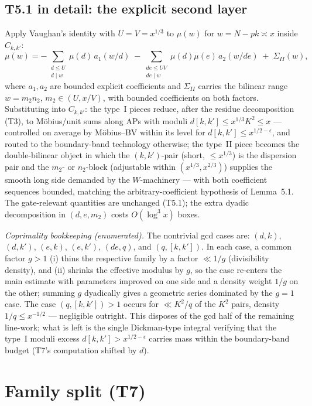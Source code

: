 \documentclass[11pt]{article}
\begin{document}
\subsection{T5.1 in detail: the explicit second layer}

Apply Vaughan's identity with $U = V = x^{1/3}$ to $\mu(w)$ for
$w = N - pk \asymp x$ inside $C_{k,k'}$:
\[
\mu(w) = -\!\!\sum_{\substack{d \le U\\ d \mid w}}\!\mu(d)\,
a_1(w/d) \;-\!\!\sum_{\substack{de \le UV\\ de \mid w}}\!\mu(d)\mu(e)\,
a_2(w/de) \;+\; \Sigma_{II}(w),
\]
where $a_1, a_2$ are bounded explicit coefficients and $\Sigma_{II}$
carries the bilinear range $w = m_2 n_2$, $m_2 \in (U, x/V)$, with
bounded coefficients on both factors. Substituting into $C_{k,k'}$:
the type~I pieces reduce, after the residue decomposition (T3), to
M\"obius/unit sums along APs with moduli $d[k,k'] \le x^{1/3}K^2
\le x$ --- controlled on average by M\"obius--BV within its level for
$d[k,k'] \le x^{1/2-\epsilon}$, and routed to the boundary-band
technology otherwise; the type~II piece becomes the double-bilinear
object in which the $(k,k')$-pair (short, $\le x^{1/3}$) is the
dispersion pair and the $m_2$- or $n_2$-block (adjustable within
$(x^{1/3}, x^{2/3})$) supplies the smooth long side demanded by the
$W$-machinery --- with both coefficient sequences bounded, matching
the arbitrary-coefficient hypothesis of Lemma~5.1. The gate-relevant
quantities are unchanged (T5.1); the extra dyadic decomposition in
$(d, e, m_2)$ costs $O(\log^3 x)$ boxes.

\emph{Coprimality bookkeeping (enumerated).} The nontrivial gcd cases
are: $(d, k)$, $(d, k')$, $(e, k)$, $(e, k')$, $(de, q)$, and
$(q, [k,k'])$. In each case, a common factor $g > 1$ (i) thins the
respective family by a factor $\ll 1/g$ (divisibility density), and
(ii) shrinks the effective modulus by $g$, so the case re-enters the
main estimate with parameters improved on one side and a density
weight $1/g$ on the other; summing $g$ dyadically gives a geometric
series dominated by the $g = 1$ case. The case $(q, [k,k'])>1$
occurs for $\ll K^2/q$ of the $K^2$ pairs, density $1/q \le
x^{-1/2}$ --- negligible outright. This disposes of the gcd half of
the remaining line-work; what is left is the single Dickman-type
integral verifying that the type~I moduli excess
$d[k,k'] > x^{1/2-\epsilon}$ carries mass within the boundary-band
budget (T7's computation shifted by $d$).

\section{Family split (T7)}
\end{document}
